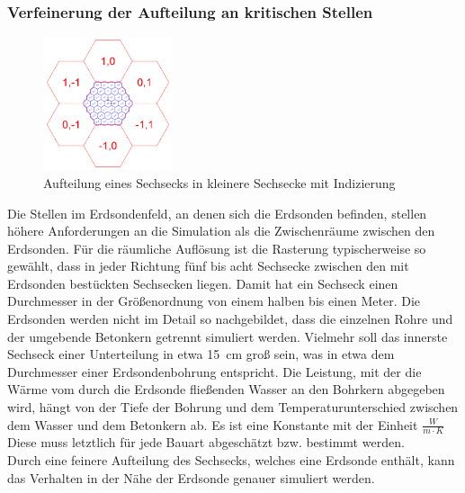 \documentclass[12pt,a4paper]{article}
\begin{document}
\subsubsection{Verfeinerung der Aufteilung an kritischen Stellen}
\begin{figure}
  \centering
  \includegraphics[width=0.34\textwidth]{HexagonSubdevide.png}
  \caption{Aufteilung eines Sechsecks in kleinere Sechsecke mit Indizierung}
  \label{fig:hexsubdevision}
\end{figure}
Die Stellen im Erdsondenfeld, an denen sich die Erdsonden befinden, stellen höhere Anforderungen an die Simulation als die Zwischenräume zwischen den Erdsonden. Für die räumliche Auflösung ist die Rasterung typischerweise so gewählt, dass in jeder Richtung fünf bis acht Sechsecke zwischen den mit Erdsonden bestückten Sechsecken liegen. Damit hat ein Sechseck einen Durchmesser in der Größenordnung von einem halben bis einen Meter. Die Erdsonden werden nicht im Detail so nachgebildet, dass die einzelnen Rohre und der umgebende Betonkern getrennt simuliert werden. Vielmehr soll das innerste Sechseck einer Unterteilung in etwa 15~cm groß sein, was in etwa dem Durchmesser einer Erdsondenbohrung entspricht. Die Leistung, mit der die Wärme vom durch die Erdsonde fließenden Wasser an den Bohrkern abgegeben wird, hängt von der Tiefe der Bohrung und dem Temperaturunterschied zwischen dem Wasser und dem Betonkern ab. Es ist eine Konstante mit der Einheit $\frac{W}{m \cdot K}$ Diese muss letztlich für jede Bauart abgeschätzt bzw. bestimmt werden.\\
Durch eine feinere Aufteilung des Sechsecks, welches eine Erdsonde enthält, kann das Verhalten in der Nähe der Erdsonde genauer simuliert werden.
\end{document}
